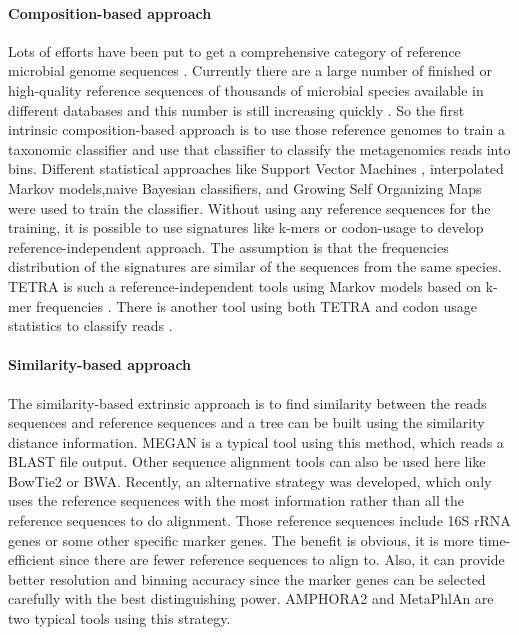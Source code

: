 \paragraph{Composition-based approach} Lots of efforts have been put to get a
comprehensive category of reference microbial genome sequences \cite{HMScience,
Wu:2009aa}. Currently there are a large number of finished or high-quality
reference sequences of thousands of microbial species available in different
databases and this number is still increasing quickly \cite{Markowitz:2012aa,
Glass:2010aa, Wang:2007aa}. So the first intrinsic composition-based approach
is to use those reference genomes to train a taxonomic classifier and use that
classifier to classify the metagenomics reads into bins. Different statistical
approaches like Support Vector Machines \cite{Patil:2012aa}, interpolated
Markov models\cite{Brady:2011aa},naive Bayesian classifiers, and Growing Self
Organizing Maps \cite{Rosen:2011aa} were used to train the classifier. Without
using any reference sequences for the training, it is possible to use
signatures like k-mers or codon-usage to develop reference-independent
approach. The assumption is that the frequencies distribution of the signatures
are similar of the sequences from the same species. TETRA is such a
reference-independent tools using Markov models based on k-mer frequencies
\cite{Teeling:2004aa}. There is another tool using both TETRA and codon usage
statistics to classify reads \cite{Tzahor:2009aa}.


\paragraph{Similarity-based approach} The similarity-based extrinsic approach
is to find similarity between the reads sequences and reference sequences and a
tree can be built using the similarity distance information. MEGAN
\cite{Huson:2007aa} is a typical tool using this method, which reads a BLAST
file output. Other sequence alignment tools can also be used here like BowTie2
or BWA. Recently, an alternative strategy was developed, which only uses the
reference sequences with the most information rather than all the reference
sequences to do alignment. Those reference sequences include 16S rRNA genes or
some other specific marker genes. The benefit is obvious, it is more
time-efficient since there are fewer reference sequences to align to. Also, it
can provide better resolution and binning accuracy since the marker genes can
be selected carefully with the best distinguishing power. AMPHORA2
\cite{Wu:2012aa} and MetaPhlAn \cite{Segata:2012aa} are two typical tools using
this strategy.



